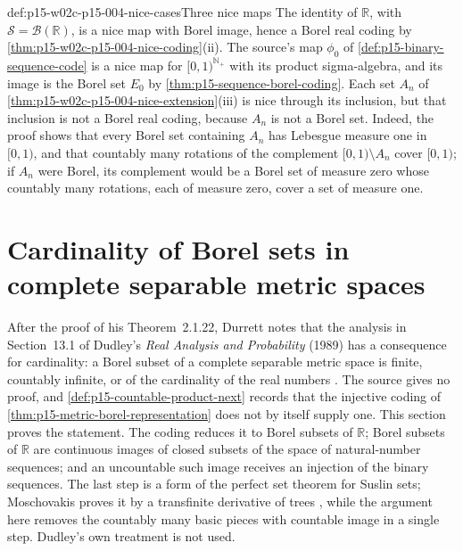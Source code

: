 \begin{hbexample}{def:p15-w02c-p15-004-nice-cases}{Three nice maps}
The identity of \(\mathbb R\), with \(\mathcal S=\mathcal B(\mathbb R)\), is
a nice map with Borel image, hence a Borel real coding by
\cref{thm:p15-w02c-p15-004-nice-coding}(ii). The source's map
\(\phi_0\) of \cref{def:p15-binary-sequence-code} is a nice map for
\([0,1)^{\mathbb N_+}\) with its product sigma-algebra, and its image is
the Borel set \(E_0\) by \cref{thm:p15-sequence-borel-coding}. Each set
\(A_n\) of \cref{thm:p15-w02c-p15-004-nice-extension}(iii) is nice through
its inclusion, but that inclusion is not a Borel real coding, because
\(A_n\) is not a Borel set. Indeed, the proof shows that every Borel set
containing \(A_n\) has Lebesgue measure one in \([0,1)\), and that
countably many rotations of the complement \([0,1)\setminus A_n\) cover
\([0,1)\); if \(A_n\) were Borel, its complement would be a Borel set of
measure zero whose countably many rotations, each of measure zero, cover
a set of measure one.
\end{hbexample}

\section{Cardinality of Borel sets in complete separable metric spaces}
\label{sec:p15-w02c-p15-004-borel-cardinality}

After the proof of his Theorem~2.1.22, Durrett notes that the analysis
in Section~13.1 of Dudley's \emph{Real Analysis and Probability} (1989)
has a consequence for cardinality: a Borel subset of a complete
separable metric space is finite, countably infinite, or of the
cardinality of the real numbers \cite[p.~54]{DurrettPTEAuthor2019}. The
source gives no proof, and \cref{def:p15-countable-product-next} records
that the injective coding of \cref{thm:p15-metric-borel-representation}
does not by itself supply one. This section proves the statement. The
coding reduces it to Borel subsets of \(\mathbb R\); Borel subsets of
\(\mathbb R\) are continuous images of closed subsets of the space of
natural-number sequences; and an uncountable such image receives an
injection of the binary sequences. The last step is a form of the
perfect set theorem for Suslin sets; Moschovakis proves it by a
transfinite derivative of trees
\cite[2C.2, pp.~59--61; 2C.3, p.~61]{Moschovakis2009DSTAuthor}, while
the argument here removes the countably many basic pieces with countable
image in a single step. Dudley's own treatment is not used.

